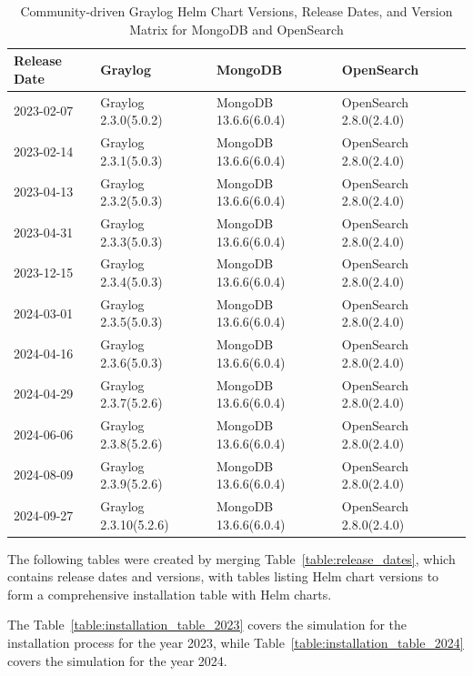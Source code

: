\documentclass[../main.tex]{subfiles}
\begin{document}
\begin{table}[h]
\centering
\begin{tabular}{|l|l|l|l|}
\hline
\textbf{Release Date} & \textbf{Graylog}  & \textbf{MongoDB} & \textbf{OpenSearch} \\ \hline
    2023-02-07 & Graylog 2.3.0(5.0.2) & MongoDB 13.6.6(6.0.4) & OpenSearch 2.8.0(2.4.0) \\ \hline
    2023-02-14 & Graylog 2.3.1(5.0.3) & MongoDB 13.6.6(6.0.4) & OpenSearch 2.8.0(2.4.0) \\ \hline
    2023-04-13 & Graylog 2.3.2(5.0.3) & MongoDB 13.6.6(6.0.4) & OpenSearch 2.8.0(2.4.0) \\ \hline
    2023-04-31 & Graylog 2.3.3(5.0.3) & MongoDB 13.6.6(6.0.4) & OpenSearch 2.8.0(2.4.0) \\ \hline
    2023-12-15 & Graylog 2.3.4(5.0.3) & MongoDB 13.6.6(6.0.4) & OpenSearch 2.8.0(2.4.0) \\ \hline
    2024-03-01 & Graylog 2.3.5(5.0.3) & MongoDB 13.6.6(6.0.4) & OpenSearch 2.8.0(2.4.0) \\ \hline
    2024-04-16 & Graylog 2.3.6(5.0.3) & MongoDB 13.6.6(6.0.4) & OpenSearch 2.8.0(2.4.0) \\ \hline
    2024-04-29 & Graylog 2.3.7(5.2.6) & MongoDB 13.6.6(6.0.4) & OpenSearch 2.8.0(2.4.0) \\ \hline
    2024-06-06 & Graylog 2.3.8(5.2.6) & MongoDB 13.6.6(6.0.4) & OpenSearch 2.8.0(2.4.0) \\ \hline
    2024-08-09 & Graylog 2.3.9(5.2.6) & MongoDB 13.6.6(6.0.4) & OpenSearch 2.8.0(2.4.0) \\ \hline
    2024-09-27 & Graylog 2.3.10(5.2.6) & MongoDB 13.6.6(6.0.4) & OpenSearch 2.8.0(2.4.0) \\ \hline
\end{tabular}
\caption{Community-driven Graylog Helm Chart Versions, Release Dates, and Version Matrix for MongoDB and OpenSearch \protect\footnotemark}
\label{table:graylog_helm_versions}
\end{table}


The following tables were created by merging Table~\ref{table:release_dates}, which contains release dates and versions, with tables listing Helm chart versions to form a comprehensive installation table with Helm charts.

The Table~\ref{table:installation_table_2023} covers the simulation for the installation process for the year 2023, while Table~\ref{table:installation_table_2024} covers the simulation for the year 2024.
\end{document}
